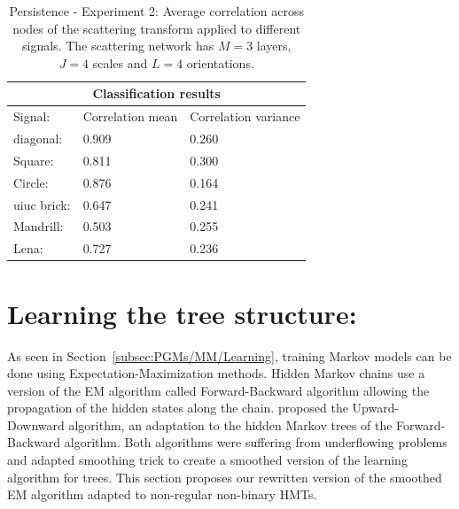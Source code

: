 \documentclass[a4paper,11pt]{report}
\begin{document}
		\begin{center}
			\begin{table}[h]
				\begin{center}				
					\begin{tabular}{|p{3cm}||p{4cm}|p{4cm}|}
						\hline
						\multicolumn{3}{|c|}{Classification results} \\
						\hline
						 Signal:				&	Correlation mean	& Correlation variance	\\
						\hline
						diagonal:						& 0.909					& 0.260								\\
						Square:							& 0.811					& 0.300								\\
						Circle:							& 0.876					& 0.164								\\
						uiuc brick:					& 0.647					& 0.241								\\
						Mandrill:						& 0.503					& 0.255								\\
						Lena:								& 0.727					& 0.236								\\

						\hline
					\end{tabular}
				\end{center}
				\caption[Persistence - Experiment 2.]{\centering Persistence - Experiment 2: Average correlation across nodes of the scattering transform applied to different signals. The scattering network has $M=3$ layers, $J=4$ scales and $L=4$ orientations.}
				\label{table:Persistence - 2}
			\end{table}
		\end{center}
	
		
  \section{Learning the tree structure:}
    \label{sec:SCHMT/Learning}
    
    As seen in Section~\ref{subsec:PGMs/MM/Learning}, training Markov  models can be done using Expectation-Maximization methods. Hidden Markov chains use a version of the EM algorithm called Forward-Backward algorithm allowing the propagation of the hidden states along the chain. \citet{crouse1998wavelet} proposed the Upward-Downward algorithm, an adaptation to the hidden Markov trees of the Forward-Backward algorithm. Both algorithms were suffering from underflowing problems~\citep{ephraim2002hidden} and \citet{durand2004computational} adapted \citet{devijver1985baum} smoothing trick to create a smoothed version of the learning algorithm for trees. This section proposes our rewritten version of the smoothed EM algorithm adapted to non-regular non-binary HMTs.\\
       
\end{document}
